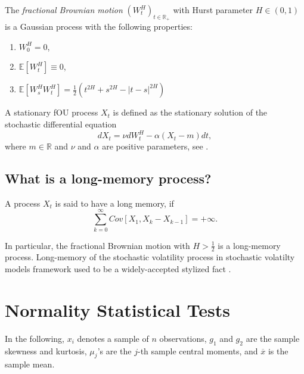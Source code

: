     \begin{definition}
        The \emph{fractional Brownian motion} $(W_t^H)_{t\in \mathbb{R_+}}$ with Hurst 
        parameter $H \in (0, 1)$ is a Gaussian process with the following properties:
        \begin{enumerate}
            \item $W_0^H = 0$,
            \item $\mathbb{E}\left[W_t^H\right] \equiv 0$,
            \item $\mathbb{E}\left[W_s^H W_t^H\right] = \frac{1}{2} \left(t^{2H} + s^{2H} - |t-s|^{2H}\right)$
        \end{enumerate}
    \end{definition}

    \begin{definition}
        A stationary fOU process $X_t$ is defined as the stationary solution of the stochastic differential equation
        \begin{equation}
            dX_t = \nu dW^H_t - \alpha (X_t - m)dt,
        \end{equation}
        where $m \in \mathbb{R}$ and $\nu$ and $\alpha$ are positive parameters, see \cite{Cheridito2003}.
    \end{definition}

    \subsection{What is a long-memory process?}
        \begin{definition}
            A process $X_t$ is said to have a long memory, if 
            \begin{equation}
                \sum_{k=0}^{\infty}Cov\left[X_1 , X_{k} - X_{k-1}\right] = +\infty.
            \end{equation}
        \end{definition}

        In particular, the fractional Brownian motion with $H > \frac{1}{2}$ is a long-memory process.
        Long-memory of the stochastic volatility process in stochastic volatilty models framework used to be a 
        widely-accepted stylized fact \cite{Breidt1998,ComteRenault1998,Comte1996,Ding1993}.

        \section{Normality Statistical Tests}\label{sec:statisticaltest}
        In the following, $x_i$ denotes a sample of $n$ observations, $g_1$ and $g_2$ are the sample 
        skewness and kurtosis, $\mu_j$'s are the $j$-th sample central moments, and $\overline{x}$ is the 
        sample mean. 

